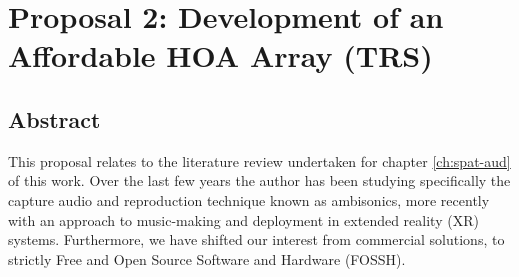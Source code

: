 \chapter{Proposal 2: Development of an Affordable HOA Array (TRS)} \label{ch:prop-trs}









%




\section{Abstract}

This proposal relates to the literature review undertaken for chapter \ref{ch:spat-aud} of this work. Over the last few years the author has been studying specifically the capture audio and reproduction technique known as ambisonics, more recently with an approach to music-making and deployment in extended reality (XR) systems. Furthermore, we have shifted our interest from commercial solutions, to strictly Free and Open Source Software and Hardware (FOSSH).

